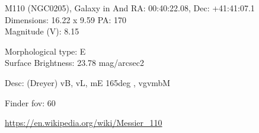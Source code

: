 \begin{block}{M110 (NGC0205), Galaxy in And}
    RA: 00:40:22.08, Dec: +41:41:07.1 \\ 
    Dimensions: 16.22 x 9.59 PA: 170 \\ 
    Magnitude (V): 8.15

    Morphological type: E \\ 
    Surface Brightness: 23.78 mag/arcsec2 

    Desc: (Dreyer) vB, vL, mE 165deg , vgvmbM 

    Finder fov: 60 

    \url{https://en.wikipedia.org/wiki/Messier_110} 
\end{block}
